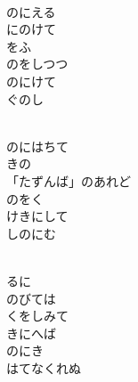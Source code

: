 \documentclass[10pt,b5j]{tarticle} %
\begin{document}
\vspace{1.5em} %
\newcommand{\linespace}{0.5em} %
\newcommand{\blocksize}{0.5\hsize} %
\newcommand{\itemmargin}{6em} %
\begin{enumerate} %
    \setlength{\itemindent}{\itemmargin} %
    \begin{minipage}[c]{\blocksize}
    
        \vspace{\linespace}
        \item~\\
        のにえる\\
        にのけて\\
        をふ\\
        のをしつつ\\
        のにけて\\
        ぐのし
        
        \vspace{\linespace}
        \item~\\
        のにはちて\\
        きの\\
        「たずんば」のあれど\\
        のをく\\
        けきにして\\
        しのにむ
        
        \vspace{\linespace}
        \item~\\
        るに\\
        のびては\\
        くをしみて\\
        きにへば\\
        のにき\\
        はてなくれぬ
        

\end{minipage}
\end{enumerate}
\end{document}
